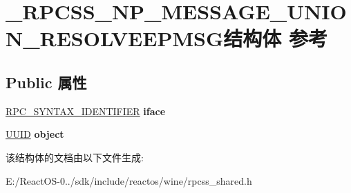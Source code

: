 \hypertarget{struct___r_p_c_s_s___n_p___m_e_s_s_a_g_e___u_n_i_o_n___r_e_s_o_l_v_e_e_p_m_s_g}{}\section{\+\_\+\+R\+P\+C\+S\+S\+\_\+\+N\+P\+\_\+\+M\+E\+S\+S\+A\+G\+E\+\_\+\+U\+N\+I\+O\+N\+\_\+\+R\+E\+S\+O\+L\+V\+E\+E\+P\+M\+S\+G结构体 参考}
\label{struct___r_p_c_s_s___n_p___m_e_s_s_a_g_e___u_n_i_o_n___r_e_s_o_l_v_e_e_p_m_s_g}
\subsection*{Public 属性}
\begin{DoxyCompactItemize}
\item 
\mbox{\label{struct___r_p_c_s_s___n_p___m_e_s_s_a_g_e___u_n_i_o_n___r_e_s_o_l_v_e_e_p_m_s_g_acb60bde7f4352988d145841c555b4f7f}} 
\hyperlink{struct___r_p_c___s_y_n_t_a_x___i_d_e_n_t_i_f_i_e_r}{R\+P\+C\+\_\+\+S\+Y\+N\+T\+A\+X\+\_\+\+I\+D\+E\+N\+T\+I\+F\+I\+ER} {\bfseries iface}
\item 
\mbox{\label{struct___r_p_c_s_s___n_p___m_e_s_s_a_g_e___u_n_i_o_n___r_e_s_o_l_v_e_e_p_m_s_g_a1878e3fa6d4d1cb6f290544e82a10217}} 
\hyperlink{interface_g_u_i_d}{U\+U\+ID} {\bfseries object}
\end{DoxyCompactItemize}


该结构体的文档由以下文件生成\+:\begin{DoxyCompactItemize}
\item 
E\+:/\+React\+O\+S-\/0../sdk/include/reactos/wine/rpcss\+\_\+shared.\+h\end{DoxyCompactItemize}
